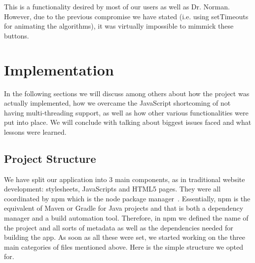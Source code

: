 \documentclass{l4proj}
\begin{document}
\begin{itemize}
This is a functionality desired by most of our users as well as Dr. Norman. However, due to the previous compromise we
have stated (i.e. using setTimeouts for animating the algorithms), it was virtually impossible to mimmick these
buttons.


\chapter{Implementation}
\label{implementation}

In the following sections we will discuss among others about how the project was actually implemented, how we overcame the
JavaScript shortcoming of not having multi-threading support, as well as how other various functionalities were put
into place. We will conclude with talking about biggest issues faced and what lessons were learned. 

\section{Project Structure}

We have split our application into 3 main components, as in traditional website development: stylesheets, JavaScripts
and HTML5 pages. They were all coordinated by npm which is the node package manager~\cite{citation-here}. Essentially,
npm is the equivalent of Maven or Gradle for Java projects and that is both a dependency manager and a build automation
tool. Therefore, in npm we defined the name of the project and all sorts of metadata as well as the dependencies needed
for building the app. As soon as all these were set, we started working on the three main categories of files mentioned
above. Here is the simple structure we opted for.



\end{itemize}
\end{document}

